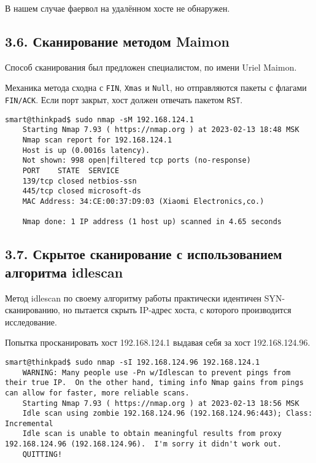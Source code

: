 В нашем случае фаервол на удалённом хосте не обнаружен.

\subsection*{3.6. Сканирование методом Maimon}

Способ сканирования был предложен специалистом, по имени Uriel Maimon.

Механика метода сходна с \texttt{FIN}, \texttt{Xmas} и \texttt{Null}, но отправляются пакеты с флагами \texttt{FIN/ACK}. Если порт закрыт, хост должен отвечать пакетом \texttt{RST}.

\begin{Verbatim}[frame=single,breaklines=true,breakanywhere=true]
    smart@thinkpad$ sudo nmap -sM 192.168.124.1
    Starting Nmap 7.93 ( https://nmap.org ) at 2023-02-13 18:48 MSK
    Nmap scan report for 192.168.124.1
    Host is up (0.0016s latency).
    Not shown: 998 open|filtered tcp ports (no-response)
    PORT    STATE  SERVICE
    139/tcp closed netbios-ssn
    445/tcp closed microsoft-ds
    MAC Address: 34:CE:00:37:D9:03 (Xiaomi Electronics,co.)

    Nmap done: 1 IP address (1 host up) scanned in 4.65 seconds
\end{Verbatim}

\subsection*{3.7. Скрытое сканирование с использованием алгоритма idlescan}

Метод idlescan по своему алгоритму работы практически идентичен SYN-сканированию, но пытается скрыть IP-адрес хоста, с которого производится исследование.

Попытка просканировать хост 192.168.124.1 выдавая себя за хост 192.168.124.96.
\begin{Verbatim}[frame=single,breaklines=true,breakanywhere=true]
    smart@thinkpad$ sudo nmap -sI 192.168.124.96 192.168.124.1
    WARNING: Many people use -Pn w/Idlescan to prevent pings from their true IP.  On the other hand, timing info Nmap gains from pings can allow for faster, more reliable scans.
    Starting Nmap 7.93 ( https://nmap.org ) at 2023-02-13 18:56 MSK
    Idle scan using zombie 192.168.124.96 (192.168.124.96:443); Class: Incremental
    Idle scan is unable to obtain meaningful results from proxy 192.168.124.96 (192.168.124.96).  I'm sorry it didn't work out.
    QUITTING!
\end{Verbatim}

